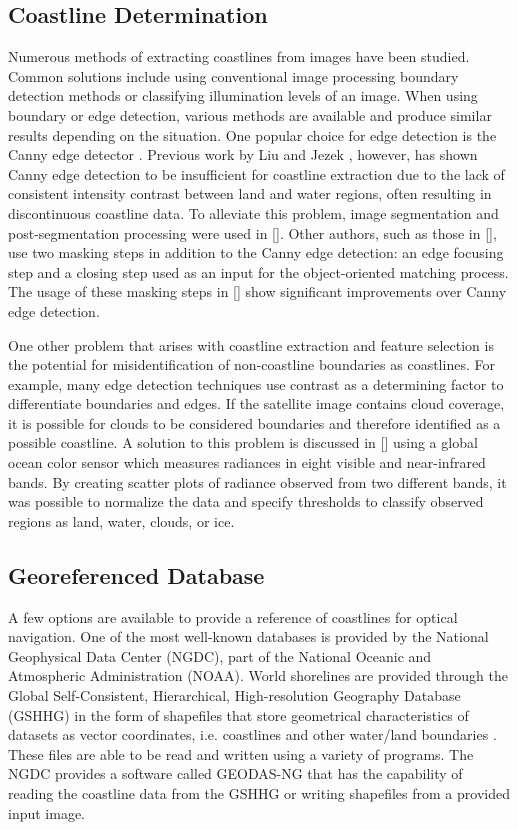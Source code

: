 \documentclass[]{aiaa-tc}%
\begin{document}
\subsection{Coastline Determination}
Numerous methods of extracting coastlines from images have been studied.  Common solutions include using conventional image processing boundary detection methods or classifying illumination levels of an image.  When using boundary or edge detection, various methods are available and produce similar results depending on the situation.  One popular choice for edge detection is the Canny edge detector \cite{Canny:1986}.  Previous work by Liu and Jezek \cite{Liu:2004}, however, has shown Canny edge detection to be insufficient for coastline extraction due to the lack of consistent intensity contrast between land and water regions, often resulting in discontinuous coastline data.  To alleviate this problem, image segmentation and post-segmentation processing were used in [].  Other authors, such as those in [], use two masking steps in addition to the Canny edge detection: an edge focusing step and a closing step used as an input for the object-oriented matching process.  The usage of these masking steps in [] show significant improvements over Canny edge detection. 

One other problem that arises with coastline extraction and feature selection is the potential for misidentification of non-coastline boundaries as coastlines.  For example, many edge detection techniques use contrast as a determining factor to differentiate boundaries and edges.  If the satellite image contains cloud coverage, it is possible for clouds to be considered boundaries and therefore identified as a possible coastline.  A solution to this problem is discussed in [] using a global ocean color sensor which measures radiances in eight visible and near-infrared bands.  By creating scatter plots of radiance observed from two different bands, it was possible to normalize the data and specify thresholds to classify observed regions as land, water, clouds, or ice.  


\subsection{Georeferenced Database}
A few options are available to provide a reference of coastlines for optical navigation.  One of the most well-known databases is provided by the National Geophysical Data Center (NGDC), part of the National Oceanic and Atmospheric Administration (NOAA).  World shorelines are provided through the Global Self-Consistent, Hierarchical, High-resolution Geography Database (GSHHG) in the form of shapefiles that store geometrical characteristics of datasets as vector coordinates, i.e. coastlines and other water/land boundaries \cite{ESRITechDes}.  These files are able to be read and written using a variety of programs.  The NGDC provides a software called GEODAS-NG that has the capability of reading the coastline data from the GSHHG or writing shapefiles from a provided input image.  
\end{document}
